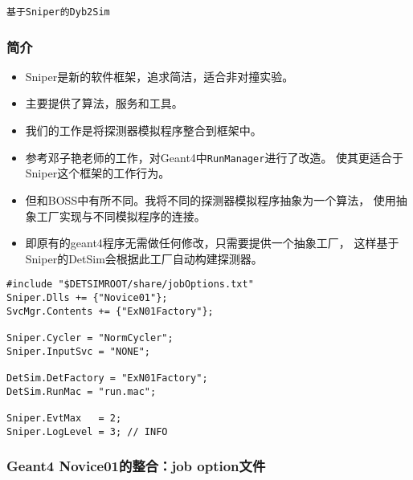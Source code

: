 \begin{frame}
    \begin{center}
        \LARGE \tt{基于Sniper的Dyb2Sim}
    \end{center}
\end{frame}


\begin{frame}
    \frametitle{简介}
    \begin{itemize}    
        \item Sniper是新的软件框架，追求简洁，适合非对撞实验。
        \item 主要提供了算法，服务和工具。
        \item 我们的工作是将探测器模拟程序整合到框架中。
        \item 参考邓子艳老师的工作，对Geant4中{\tt RunManager}进行了改造。
              使其更适合于Sniper这个框架的工作行为。
        \item 但和BOSS中有所不同。我将不同的探测器模拟程序抽象为一个算法，
              使用抽象工厂实现与不同模拟程序的连接。
        \item 即原有的geant4程序无需做任何修改，只需要提供一个抽象工厂，
              这样基于Sniper的DetSim会根据此工厂自动构建探测器。
    \end{itemize}
\end{frame}

\newsavebox{\NoviceJobOptions}
\begin{lrbox}{\NoviceJobOptions}
\begin{lstlisting}
#include "$DETSIMROOT/share/jobOptions.txt"
Sniper.Dlls += {"Novice01"};
SvcMgr.Contents += {"ExN01Factory"};

Sniper.Cycler = "NormCycler";
Sniper.InputSvc = "NONE";

DetSim.DetFactory = "ExN01Factory";
DetSim.RunMac = "run.mac";

Sniper.EvtMax   = 2;
Sniper.LogLevel = 3; // INFO
\end{lstlisting}
\end{lrbox}

\begin{frame}
    \frametitle{Geant4 Novice01的整合：job option文件}
    \par\usebox{\NoviceJobOptions}
\end{frame}

